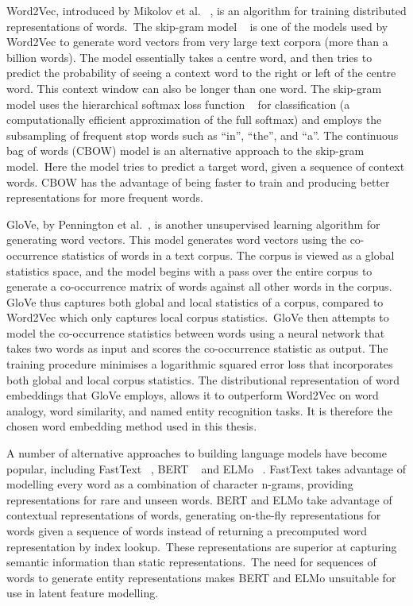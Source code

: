 \noindent Word2Vec, introduced by Mikolov et al. \unskip~\citep{mikolov2013distributed}, is an algorithm for training distributed representations of words.\ The skip-gram model \unskip ~\citep{mikolov2013efficient} is one of the models used by Word2Vec to generate word vectors from very large text corpora (more than a billion words). The model essentially takes a centre word, and then tries to predict the probability of seeing a context word to the right or left of the centre word. This context window can also be longer than one word. The skip-gram model uses the hierarchical softmax loss function \unskip~\citep{morin2005hierarchical} for classification (a computationally efficient approximation of the full softmax) and employs the subsampling of frequent stop words such as “in”, “the”, and “a”. The continuous bag of words (CBOW) model is an alternative approach to the skip-gram model.\ Here the model tries to predict a target word, given a sequence of context words. CBOW has the advantage of being faster to train and producing better representations for more frequent words. \par

\noindent GloVe, by Pennington et al.\unskip~\citep{pennington2014glove}, is another unsupervised learning algorithm for generating word vectors. This model generates word vectors using the co-occurrence statistics of words in a text corpus. The corpus is viewed as a global statistics space, and the model begins with a pass over the entire corpus to generate a co-occurrence matrix of words against all other words in the corpus. GloVe thus captures both global and local statistics of a corpus, compared to Word2Vec which only captures local corpus statistics.\ GloVe then attempts to model the co-occurrence statistics between words using a neural network that takes two words as input and scores the co-occurrence statistic as output. The training procedure minimises a logarithmic squared error loss that incorporates both global and local corpus statistics. The distributional representation of word embeddings that GloVe employs, allows it to outperform Word2Vec on word analogy, word similarity, and named entity recognition tasks. It is therefore the chosen word embedding method used in this thesis. \par

\noindent A number of alternative approaches to building language models have become popular, including FastText \unskip~\citep{bojanowski2016enriching}, BERT \unskip~\citep{vaswani2017attention} and ELMo \unskip~\citep{peters2018deep}. FastText takes advantage of modelling every word as a combination of character n-grams, providing representations for rare and unseen words. BERT and ELMo take advantage of contextual representations of words, generating on-the-fly representations for words given a sequence of words instead of returning a precomputed word representation by index lookup.\ These representations are superior at capturing semantic information than static representations.\ The need for sequences of words to generate entity representations makes BERT and ELMo unsuitable for use in latent feature modelling.


